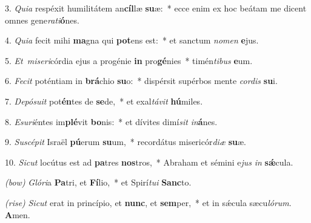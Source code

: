3. \textit{Quia} respéxit humilitátem an\textbf{cíl}læ \textbf{su}æ:~*
	ecce enim ex hoc beátam me dicent omnes gene\textit{ra}\textit{ti}\textbf{ó}nes.

4. \textit{Quia} fecit mihi \textbf{ma}gna qui \textbf{pot}ens est:~*
	et sanctum \textit{no}\textit{men} \textbf{e}jus.

5. \textit{Et\ miseri}córdia ejus a progénie \textbf{in} pro\textbf{gé}nies~*
	timén\textit{ti}\textit{bus} \textbf{e}um.

6. \textit{Fecit} poténtiam in \textbf{brá}chio \textbf{su}o:~*
	dispérsit supérbos mente \textit{cor}\textit{dis} \textbf{su}i.

7. \textit{Depósuit} pot\textbf{én}tes de \textbf{se}de,~*
	et exal\textit{tá}\textit{vit} \textbf{hú}miles.

8. \textit{Esuri}éntes im\textbf{plé}vit \textbf{bo}nis:~*
	et dívites dimí\textit{sit} \textit{in}\textbf{á}nes.

9. \textit{Suscépit} Israël \textbf{pú}erum \textbf{su}um,~*
	recordátus misericór\textit{di}\textit{æ} \textbf{su}æ.

10. \textit{Sicut} locútus est ad \textbf{pa}tres \textbf{nos}tros,~*
	Abraham et sémini e\textit{jus} \textit{in} \textbf{s\'{\ae}}cula.

{\color{red}\textit{(bow)}} \textit{Glóri}a \textbf{Pa}tri, et \textbf{Fí}lio,~*
	et Spirí\textit{tu}\textit{i} \textbf{Sanc}to.

{\color{red}\textit{(rise)}} \textit{Sicut} erat in princípio, et \textbf{nunc}, et \textbf{sem}per,~*
	et in s\'{\ae}cula sæcu\textit{ló}\textit{rum}. \textbf{A}men.